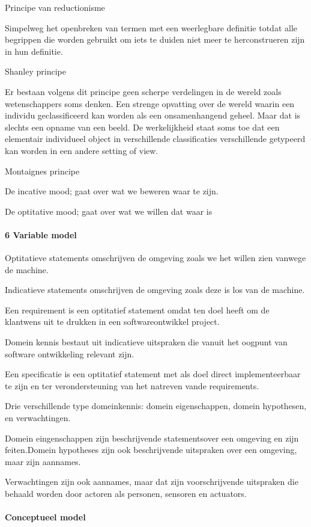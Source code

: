 Principe van reductionisme 

Simpelweg het openbreken van termen met een weerlegbare definitie totdat alle begrippen die worden gebruikt om iets te duiden  niet meer te herconstrueren zijn in hun definitie. 

Shanley principe 

Er bestaan volgens dit principe geen scherpe verdelingen in de wereld zoals wetenschappers soms denken. Een strenge opvatting over de wereld waarin een individu geclassificeerd kan worden als een onsamenhangend geheel. Maar dat is slechts een opname van een beeld. De werkelijkheid staat soms toe dat een elementair individueel object in verschillende classificaties verschillende getypeerd kan worden in een andere setting of view. 

Montaignes principe 

De incative mood; gaat over wat we beweren waar te zijn. 

De optitative mood; gaat over wat we willen dat waar is 


\paragraph{6 Variable model}
Optitatieve statements omschrijven de omgeving zoals we het willen zien vanwege de machine. 

Indicatieve statements omschrijven de omgeving zoals deze is los van de machine. 

Een requirement is een optitatief statement omdat ten doel heeft om de klantwens uit te drukken in een softwareontwikkel project. 

Domein kennis bestaut uit indicatieve uitspraken die vanuit het oogpunt van software ontwikkeling relevant zijn. 

Een specificatie is een optitatief statement met als doel direct implementeerbaar te zijn en ter verondersteuning van het natreven vande requirements. 

Drie verschillende type domeinkennis: domein eigenschappen, domein hypothesen, en verwachtingen. 

Domein eingenschappen  zijn beschrijvende statementsover een omgeving en zijn feiten.Domein hypotheses  zijn ook beschrijvende uitspraken over een omgeving, maar zijn aannames. 

Verwachtingen zijn ook aannames, maar dat zijn voorschrijvende uitspraken die behaald worden door actoren als personen, sensoren en actuators. 

  
\paragraph{Conceptueel model}



